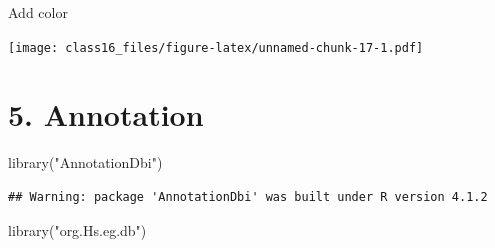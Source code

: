 \documentclass[
]{article}
\newenvironment{Shaded}{\begin{snugshade}}{\end{snugshade}}
\newcommand{\AttributeTok}[1]{\textcolor[rgb]{0.77,0.63,0.00}{#1}}
\newcommand{\DecValTok}[1]{\textcolor[rgb]{0.00,0.00,0.81}{#1}}
\newcommand{\FloatTok}[1]{\textcolor[rgb]{0.00,0.00,0.81}{#1}}
\newcommand{\FunctionTok}[1]{\textcolor[rgb]{0.00,0.00,0.00}{#1}}
\newcommand{\NormalTok}[1]{#1}
\newcommand{\OtherTok}[1]{\textcolor[rgb]{0.56,0.35,0.01}{#1}}
\newcommand{\SpecialCharTok}[1]{\textcolor[rgb]{0.00,0.00,0.00}{#1}}
\newcommand{\StringTok}[1]{\textcolor[rgb]{0.31,0.60,0.02}{#1}}
\begin{document}
Add color

\begin{Shaded}
\end{Shaded}

\texttt{[image: class16\_files/figure-latex/unnamed-chunk-17-1.pdf]}

\hypertarget{annotation}{%
\section{5. Annotation}\label{annotation}}

\begin{Shaded}
\begin{Highlighting}[]
\FunctionTok{library}\NormalTok{(}\StringTok{"AnnotationDbi"}\NormalTok{)}
\end{Highlighting}
\end{Shaded}

\begin{verbatim}
## Warning: package 'AnnotationDbi' was built under R version 4.1.2
\end{verbatim}

\begin{Shaded}
\begin{Highlighting}[]
\FunctionTok{library}\NormalTok{(}\StringTok{"org.Hs.eg.db"}\NormalTok{)}
\end{Highlighting}
\end{Shaded}
\end{document}
